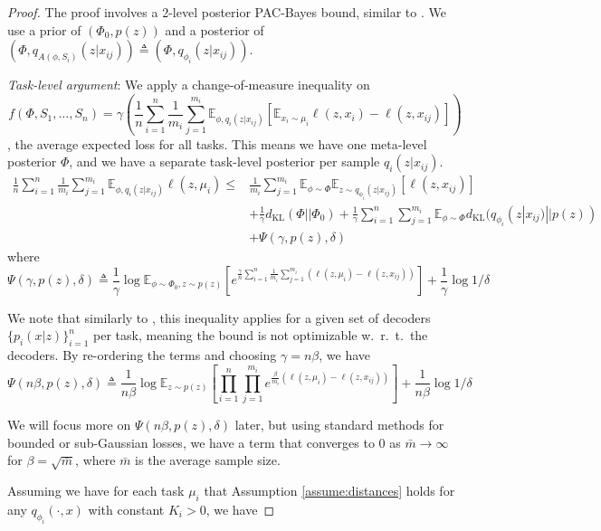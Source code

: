 \documentclass[letterpaper]{article}
\theoremstyle{definition}
\begin{document}
\begin{proof}
    The proof involves a 2-level posterior PAC-Bayes bound, similar to \citet{Rothfuss2020}.
We use a prior of $(\Phi_0,p(z))$ and a posterior of $(\Phi, q_{A(\phi,S_i)}(z|x_{ij}))\triangleq (\Phi, q_{\phi_i}(z|x_{ij}))$.

\emph{Task-level argument}:
We apply a change-of-measure inequality on $$f(\Phi, S_1,\ldots,S_n)=\gamma \left (\frac{1}{n}\sum_{i=1}^{n}\frac{1}{m_i}\sum_{j=1}^{m_i}\mathbb{E}_{\phi,q_i(z|x_{ij})}[\mathbb{E}_{x_i\sim \mu_i}\ell(z, x_i)-\ell(z, x_{ij})]\right )$$, the average expected loss for all tasks. This means we have one meta-level posterior $\Phi$, and we have a separate task-level posterior per sample $q_i(z|x_{ij})$.
\begin{equation*} 
\begin{split}
    \frac{1}{n}\sum_{i=1}^{n}\frac{1}{m_i}\sum_{j=1}^{m_i}\mathbb{E}_{\phi,q_i(z|x_{ij})}\ell(z, \mu_i)\leq &\frac{1}{m_i}\sum_{j=1}^{m_i}\mathbb{E}_{\phi\sim \Phi}\mathbb{E}_{z\sim q_{\phi_i}(z|x_{ij})}[\ell(z,x_{ij})] \\
    &+ \frac{1}{\gamma}d_{\mathrm{KL}}(\Phi||\Phi_0) + \frac{1}{\gamma}\sum_{i=1}^{n}\sum_{j=1}^{m_i}\mathbb{E}_{\phi\sim \Phi}d_{\mathrm{KL}}(q_{\phi_i}(z|x_{ij})||p(z)) \\
    &+ \Psi(\gamma, p(z), \delta)
\end{split}
\end{equation*}
where 
$$\Psi(\gamma, p(z), \delta)\triangleq \frac{1}{\gamma}\log\mathbb{E}_{\phi\sim \Phi_0, z\sim p(z)}\left [e^{\frac{\gamma}{n}\sum_{i=1}^{n}\frac{1}{m_i}\sum_{j=1}^{m_i}(\ell(z,\mu_i)-\ell(z,x_{ij}))}\right ]+\frac{1}{\gamma} \log 1/\delta$$

We note that similarly to \citep{mbacke2023statistical}, this inequality applies for a given set of decoders $\{p_i(x|z)\}_{i=1}^{n}$ per task, meaning the bound is not optimizable w.\ r.\ t.\ the decoders. By re-ordering the terms and choosing $\gamma=n\beta$, we have 
$$\Psi(n\beta, p(z), \delta)\triangleq \frac{1}{n\beta}\log\mathbb{E}_{z\sim p(z)}\left [\prod_{i=1}^{n}\prod_{j=1}^{m_i}e^{\frac{\beta}{m_i}(\ell(z,\mu_i)-\ell(z,x_{ij}))}\right ]+\frac{1}{n\beta} \log 1/\delta$$

We will focus more on $\Psi(n\beta, p(z), \delta)$ later, but using standard methods for bounded or sub-Gaussian losses, we have a term that converges to $0$ as $\bar{m}\rightarrow \infty$ for $\beta=\sqrt{\bar{m}}$, where $\bar{m}$ is the average sample size.

Assuming we have for each task $\mu_i$ that Assumption \ref{assume:distances} holds for any $q_{\phi_i}(\cdot, x)$ with constant $K_i>0$, we have  


\end{proof}
\end{document}
